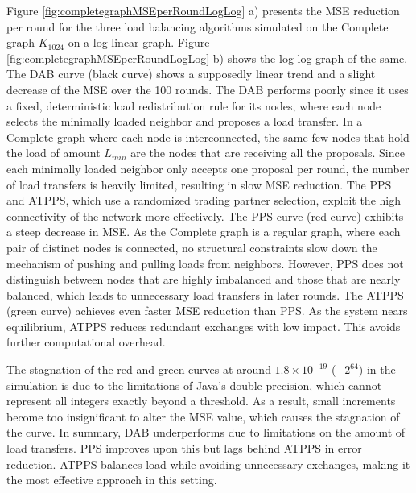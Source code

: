 Figure \ref{fig:completegraphMSEperRoundLogLog} a) presents the MSE reduction per round for the three load balancing algorithms simulated on the Complete graph $K_{1024}$ on a log-linear graph. Figure \ref{fig:completegraphMSEperRoundLogLog} b) shows the log-log graph of the same. The DAB curve (black curve) shows a supposedly linear trend and a slight decrease of the MSE over the 100 rounds. The DAB performs poorly since it uses a fixed, deterministic load redistribution rule for its nodes, where each node selects the minimally loaded neighbor and proposes a load transfer. In a Complete graph where each node is interconnected, the same few nodes that hold the load of amount $L_{min}$ are the nodes that are receiving all the proposals. Since each minimally loaded neighbor only accepts one proposal per round, the number of load transfers is heavily limited, resulting in slow MSE reduction. The PPS and ATPPS, which use a randomized trading partner selection, exploit the high connectivity of the network more effectively. The PPS curve (red curve) exhibits a steep decrease in MSE. As the Complete graph is a regular graph, where each pair of distinct nodes is connected, no structural constraints slow down the mechanism of pushing and pulling loads from neighbors. However, PPS does not distinguish between nodes that are highly imbalanced and those that are nearly balanced, which leads to unnecessary load transfers in later rounds. The ATPPS (green curve) achieves even faster MSE reduction than PPS. As the system nears equilibrium, ATPPS reduces redundant exchanges with low impact. This avoids further computational overhead.

The stagnation of the red and green curves at around $1.8\times 10^{-19}$ ($-2^{64}$) in the simulation is due to the limitations of Java's double precision, which cannot represent all integers exactly beyond a threshold. As a result, small increments become too insignificant to alter the MSE value, which causes the stagnation of the curve. In summary, DAB underperforms due to limitations on the amount of load transfers. PPS improves upon this but lags behind ATPPS in error reduction. ATPPS balances load while avoiding unnecessary exchanges, making it the most effective approach in this setting.


